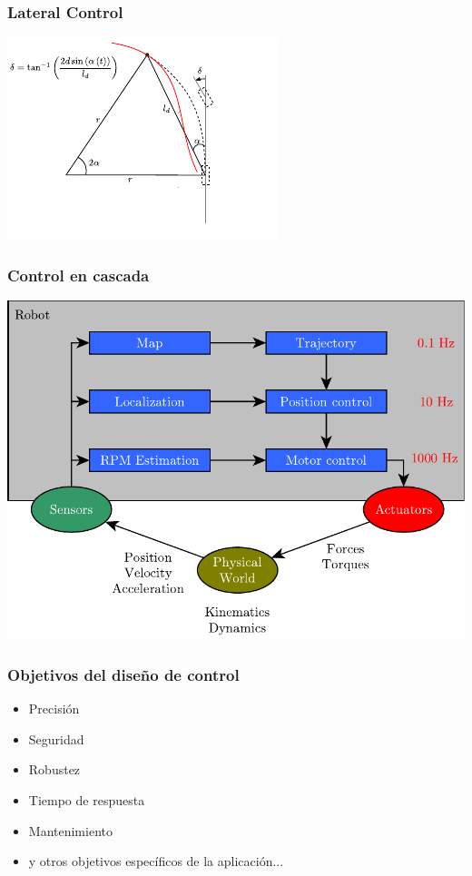\begin{frame}
    \frametitle{Lateral Control}
    
    \begin{center}
        \includegraphics[width=0.6\columnwidth]{images/lateral_control.pdf}
    \end{center}
    
\end{frame}

\begin{frame}
    \frametitle{Control en cascada}
    
    \begin{center}
        \includegraphics[width=0.7\columnwidth]{./images/control_architecture_phrequency.pdf}
    \end{center}
    
\end{frame}

\begin{frame}
    \frametitle{Objetivos del diseño de control}
    
    \begin{itemize}
        \item Precisión
        \item Seguridad
        \item Robustez
        \item Tiempo de respuesta
        \item Mantenimiento
        \item y otros objetivos específicos de la aplicación...
    \end{itemize}
    
\end{frame}


